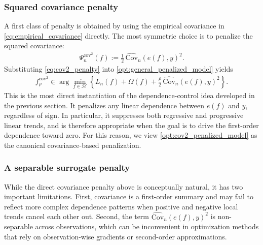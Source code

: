 \documentclass[12pt, draft]{article}
\theoremstyle{plain}
\theoremstyle{definition}
\newcommand{\1}{\mathbf{1}}
\newcommand{\Cov}{\text{Cov}}
\renewcommand{\H}{\mathcal{H}}
\begin{document}
{\subsubsection{Squared covariance penalty}

A first class of penalty is obtained by using the empirical covariance in \eqref{eq:empirical_covariance} directly. The most symmetric choice is to penalize the squared covariance:
\begin{align}
    \label{eq:cov2_penalty}
    \Psi_n^{\mathrm{cov}^2}(f)
    :=
    \frac{1}{2}\,
    \widehat{\Cov}_n(e(f),y)^2.
\end{align}
Substituting \eqref{eq:cov2_penalty} into \eqref{opt:general_penalized_model} yields
\begin{align}
    \label{opt:cov2_penalized_model}
    f_{\rho}^{\mathrm{cov}^2}
    \in
    \arg\min_{f\in\H}
    \left\{
        L_n(f)+\Omega(f)
        +
        \frac{\rho}{2}\,\widehat{\Cov}_n(e(f),y)^2
    \right\}.
\end{align}
This is the most direct instantiation of the dependence-control idea developed in the previous section. It penalizes any linear dependence between $e(f)$ and $y$, regardless of sign. In particular, it suppresses both regressive and progressive linear trends, and is therefore appropriate when the goal is to drive the first-order dependence toward zero. For this reason, we view \eqref{opt:cov2_penalized_model} as the canonical covariance-based penalization.

\subsubsection{A separable surrogate penalty}

While the direct covariance penalty above is conceptually natural, it has two important limitations. First, covariance is a first-order summary and may fail to reflect more complex dependence patterns when positive and negative local trends cancel each other out. Second, the term $\widehat{\Cov}_n(e(f),y)^2$ is non-separable across observations, which can be inconvenient in optimization methods that rely on observation-wise gradients or second-order approximations.

}
\end{document}
